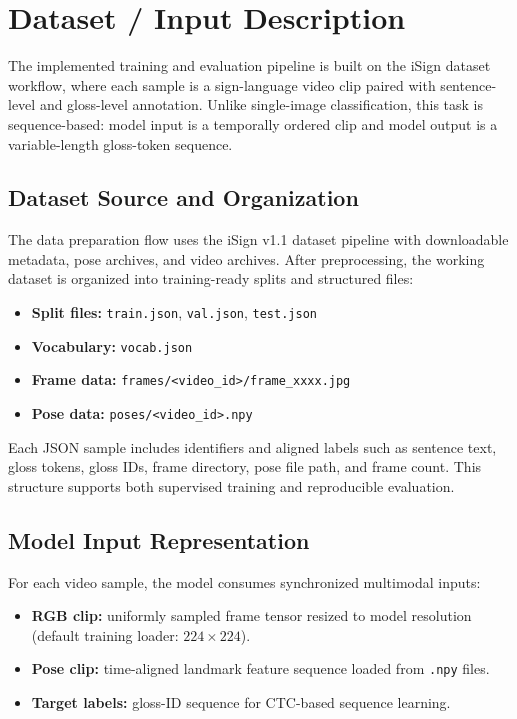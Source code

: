 \section{Dataset / Input Description}
The implemented training and evaluation pipeline is built on the iSign dataset workflow, where each sample is a sign-language video clip paired with sentence-level and gloss-level annotation. Unlike single-image classification, this task is sequence-based: model input is a temporally ordered clip and model output is a variable-length gloss-token sequence.

\subsection{Dataset Source and Organization}
The data preparation flow uses the iSign v1.1 dataset pipeline with downloadable metadata, pose archives, and video archives. After preprocessing, the working dataset is organized into training-ready splits and structured files:
\begin{itemize}[leftmargin=1.5em]
\item \textbf{Split files:} \texttt{train.json}, \texttt{val.json}, \texttt{test.json}
\item \textbf{Vocabulary:} \texttt{vocab.json}
\item \textbf{Frame data:} \texttt{frames/<video\_id>/frame\_xxxx.jpg}
\item \textbf{Pose data:} \texttt{poses/<video\_id>.npy}
\end{itemize}

Each JSON sample includes identifiers and aligned labels such as sentence text, gloss tokens, gloss IDs, frame directory, pose file path, and frame count. This structure supports both supervised training and reproducible evaluation.

\subsection{Model Input Representation}
For each video sample, the model consumes synchronized multimodal inputs:
\begin{itemize}[leftmargin=1.5em]
\item \textbf{RGB clip:} uniformly sampled frame tensor resized to model resolution (default training loader: $224\times224$).
\item \textbf{Pose clip:} time-aligned landmark feature sequence loaded from \texttt{.npy} files.
\item \textbf{Target labels:} gloss-ID sequence for CTC-based sequence learning.
\end{itemize}

